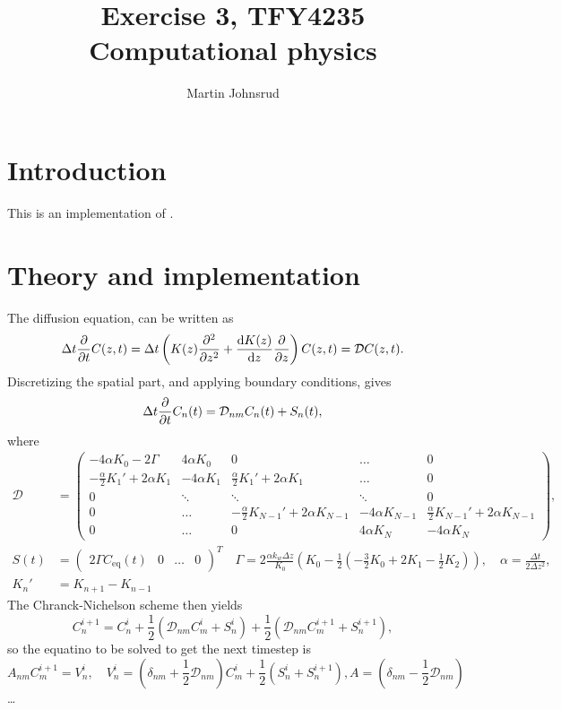 \documentclass{article}
\title{Exercise 3, TFY4235 Computational physics}
\author{Martin Johnsrud}
\date{}
\begin{document}
    \maketitle
    \section*{Introduction}
        This is an implementation of \cite{exercise}.
    \section*{Theory and implementation}
    The diffusion equation, can be written as
    \begin{equation*}
        \Delta t \pdv{t} C(z, t) = \Delta t \left(K(z) \pdv[2]{z} + \dv{K(z)}{z}\pdv{z}\right) C(z, t) = \mathcal{D} C(z, t).
    \end{equation*}
    Discretizing the spatial part, and applying boundary conditions, gives
    \begin{equation*}
        \Delta t \pdv{t} C_n(t) = \mathcal{D}_{nm} C_n(t) + S_n(t),
    \end{equation*}
    where 
    \begin{align*}
        \mathcal{D} &=
        \begin{pmatrix}
            -4\alpha K_0 - 2\Gamma & 4\alpha K_0 & 0 & \dots&0 \\
            -\frac{\alpha}{2} K_1' + 2\alpha K_1 & -4 \alpha K_1 & \frac{\alpha}{2}K_1' + 2\alpha K_1 &  \dots & 0 \\
            0 & \ddots & \ddots & \ddots & 0\\
            0 & \dots &-\frac{\alpha}{2} K_{N-1}' + 2\alpha K_{N-1} & -4 \alpha K_{N-1} & \frac{\alpha}{2}K_{N-1}' + 2\alpha K_{N-1} \\
             0 & \dots & 0 & 4\alpha K_N & -4\alpha K_N
        \end{pmatrix},\\
        S(t) & =  
        \begin{pmatrix}
            2\Gamma C_\mathrm{eq}(t) &0&\dots&0
        \end{pmatrix}^T \quad 
    \Gamma = 2 \frac{\alpha k_w \Delta z}{K_0} \left(K_0 - \frac{1}{2}(-\frac{3}{2} K_0 + 2K_1 - \frac{1}{2}K_2)\right), \quad
     \alpha = \frac{\Delta t}{2 \Delta z^2 },\\
      K_n' & = K_{n+1} - K_{n-1}
    \end{align*}
    The Chranck-Nichelson scheme then yields
    \begin{equation*}
        C_n^{i+1}  = C_n^i + \frac{1}{2} (\mathcal{D}_{nm} C_m^i + S_n^i) + \frac{1}{2} (\mathcal{D}_{nm} C_m^{i+1} + S_n^{i+1}),
    \end{equation*}
    so the equatino to be solved to get the next timestep is
    \begin{equation*}
        A_{nm} C_{m}^{i+1} = V_n^i, \quad V_n^i = \left(\delta_{nm} + \frac{1}{2} \mathcal{D}_{nm}\right) C_m^i + \frac{1}{2}(S_n^i + S_n^{i+1}), A = \left(\delta_{nm} - \frac{1}{2} \mathcal{D}_{nm}\right)
    \end{equation*}
    \dots
\end{document}
